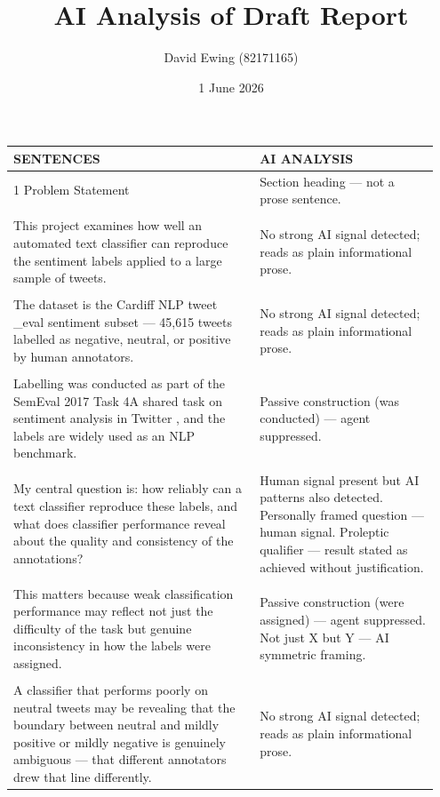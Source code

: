 \documentclass[11pt]{article}
\title{AI Analysis of Draft Report}
\author{David Ewing (82171165)}
\date{1 June 2026}
\begin{document}
\maketitle
\thispagestyle{empty}
\newpage

\setlength{\LTleft}{0pt}
\setlength{\LTright}{0pt}
\begin{longtable}{|p{0.55\linewidth}|p{0.40\linewidth}|}
\hline
\centering\textbf{SENTENCES} & \centering\textbf{AI ANALYSIS} \tabularnewline[2pt]
\hline
\endhead
1 Problem Statement & Section heading --- not a prose sentence. \\[2pt]
\hline
\rule{0pt}{3.5cm} & \\
\hline
This project examines how well an automated text classifier can reproduce the sentiment labels applied to a large sample of tweets. & No strong AI signal detected; reads as plain informational prose. \\[2pt]
\hline
\rule{0pt}{3.5cm} & \\
\hline
The dataset is the Cardiff NLP tweet \_eval sentiment subset --- 45,615 tweets labelled as negative, neutral, or positive by human annotators. & No strong AI signal detected; reads as plain informational prose. \\[2pt]
\hline
\rule{0pt}{3.5cm} & \\
\hline
Labelling was conducted as part of the SemEval 2017 Task 4A shared task on sentiment analysis in Twitter , and the labels are widely used as an NLP benchmark. & Passive construction (was conducted) --- agent suppressed. \\[2pt]
\hline
\rule{0pt}{3.5cm} & \\
\hline
My central question is: how reliably can a text classifier reproduce these labels, and what does classifier performance reveal about the quality and consistency of the annotations? & Human signal present but AI patterns also detected. Personally framed question --- human signal. Proleptic qualifier --- result stated as achieved without justification. \\[2pt]
\hline
\rule{0pt}{3.5cm} & \\
\hline
This matters because weak classification performance may reflect not just the difficulty of the task but genuine inconsistency in how the labels were assigned. & Passive construction (were assigned) --- agent suppressed. Not just X but Y --- AI symmetric framing. \\[2pt]
\hline
\rule{0pt}{3.5cm} & \\
\hline
A classifier that performs poorly on neutral tweets may be revealing that the boundary between neutral and mildly positive or mildly negative is genuinely ambiguous --- that different annotators drew that line differently. & No strong AI signal detected; reads as plain informational prose. \\[2pt]

\end{longtable}
\end{document}
